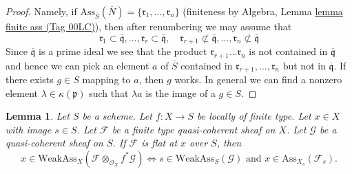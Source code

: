 \documentclass{amsart}
\theoremstyle{plain}
\newtheorem{lemma}[subsection]{Lemma}
\theoremstyle{definition}
\theoremstyle{remark}
\numberwithin{equation}{subsection}
\begin{document}
\begin{proof}
Namely, if $\text{Ass}_{\overline{S}}(\overline{N}) =
\{\mathfrak r_1, \ldots, \mathfrak r_n\}$
(finiteness by Algebra, Lemma \href{https://stacks.math.columbia.edu/tag/00LC}{lemma finite ass (Tag 00LC)}),
then after renumbering we may assume that
$$
\mathfrak r_1 \subset \overline{\mathfrak q},
\ldots,
\mathfrak r_r \subset \overline{\mathfrak q}, \quad
\mathfrak r_{r + 1} \not \subset \overline{\mathfrak q},
\ldots,
\mathfrak r_n \not \subset \overline{\mathfrak q}
$$
Since $\overline{\mathfrak q}$ is a prime ideal we see that the product
$\mathfrak r_{r + 1} \ldots \mathfrak r_n$ is not contained in
$\overline{\mathfrak q}$ and hence we can pick an element
$a$ of $\overline{S}$ contained in
$\mathfrak r_{r + 1}, \ldots, \mathfrak r_n$ but not in
$\overline{\mathfrak q}$.
If there exists $g \in S$ mapping to $a$, then $g$
works. In general we can find a nonzero element
$\lambda \in \kappa(\mathfrak p)$
such that $\lambda a$ is the image of a $g \in S$.
\end{proof}


\begin{lemma}
\label{lemma-bourbaki-finite-type-general-base-at-point}
Let $S$ be a scheme.
Let $f : X \to S$ be locally of finite type.
Let $x \in X$ with image $s \in S$.
Let $\mathcal{F}$ be a finite type quasi-coherent sheaf on $X$.
Let $\mathcal{G}$ be a quasi-coherent sheaf on $S$.
If $\mathcal{F}$ is flat at $x$ over $S$, then
$$
x \in \text{WeakAss}_X(\mathcal{F} \otimes_{\mathcal{O}_X} f^*\mathcal{G})
\Leftrightarrow
s \in \text{WeakAss}_S(\mathcal{G})
\text{ and }
x \in \text{Ass}_{X_s}(\mathcal{F}_s).
$$
\end{lemma}
\end{document}
